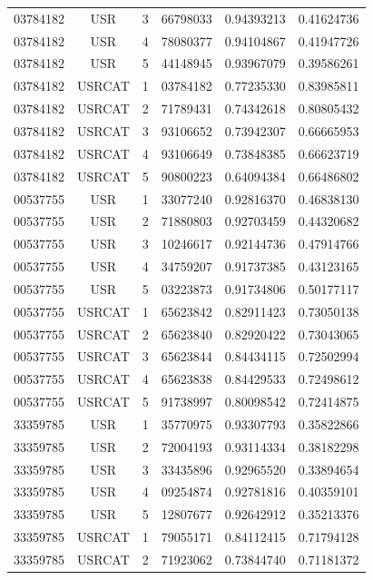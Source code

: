 \begin{longtable}{cccccc}
03784182 & USR    & 3 & 66798033 & 0.94393213 & 0.41624736\\
03784182 & USR    & 4 & 78080377 & 0.94104867 & 0.41947726\\
03784182 & USR    & 5 & 44148945 & 0.93967079 & 0.39586261\\
03784182 & USRCAT & 1 & 03784182 & 0.77235330 & 0.83985811\\%
03784182 & USRCAT & 2 & 71789431 & 0.74342618 & 0.80805432\\
03784182 & USRCAT & 3 & 93106652 & 0.73942307 & 0.66665953\\
03784182 & USRCAT & 4 & 93106649 & 0.73848385 & 0.66623719\\
03784182 & USRCAT & 5 & 90800223 & 0.64094384 & 0.66486802\\
\hline
00537755 & USR    & 1 & 33077240 & 0.92816370 & 0.46838130\\%
00537755 & USR    & 2 & 71880803 & 0.92703459 & 0.44320682\\
00537755 & USR    & 3 & 10246617 & 0.92144736 & 0.47914766\\
00537755 & USR    & 4 & 34759207 & 0.91737385 & 0.43123165\\
00537755 & USR    & 5 & 03223873 & 0.91734806 & 0.50177117\\
00537755 & USRCAT & 1 & 65623842 & 0.82911423 & 0.73050138\\%
00537755 & USRCAT & 2 & 65623840 & 0.82920422 & 0.73043065\\
00537755 & USRCAT & 3 & 65623844 & 0.84434115 & 0.72502994\\
00537755 & USRCAT & 4 & 65623838 & 0.84429533 & 0.72498612\\
00537755 & USRCAT & 5 & 91738997 & 0.80098542 & 0.72414875\\
\hline
33359785 & USR    & 1 & 35770975 & 0.93307793 & 0.35822866\\%
33359785 & USR    & 2 & 72004193 & 0.93114334 & 0.38182298\\
33359785 & USR    & 3 & 33435896 & 0.92965520 & 0.33894654\\
33359785 & USR    & 4 & 09254874 & 0.92781816 & 0.40359101\\
33359785 & USR    & 5 & 12807677 & 0.92642912 & 0.35213376\\
33359785 & USRCAT & 1 & 79055171 & 0.84112415 & 0.71794128\\%
33359785 & USRCAT & 2 & 71923062 & 0.73844740 & 0.71181372\\

\end{longtable}
